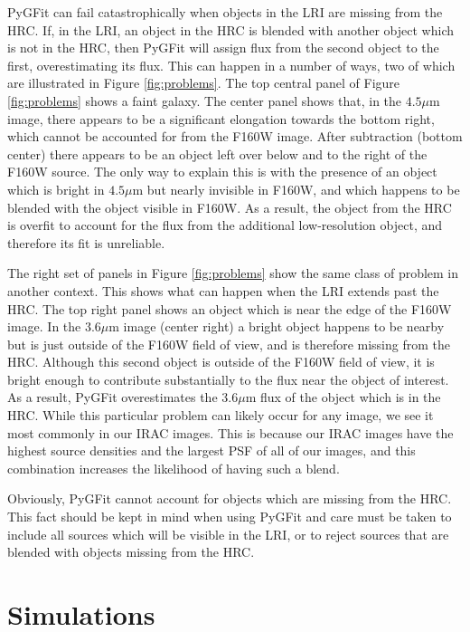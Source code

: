 \documentclass[apj]{emulateapj}
\newcommand{\pygfit}{PyGFit}
\begin{document}
\pygfit{} can fail catastrophically when objects in the LRI are missing from the HRC.  If, in the LRI, an object in the HRC is blended with another object which is not in the HRC, then \pygfit{} will assign flux from the second object to the first, overestimating its flux.  This can happen in a number of ways, two of which are illustrated in Figure \ref{fig:problems}.  The top central panel of Figure \ref{fig:problems} shows a faint galaxy.  The center panel shows that, in the $4.5\mu$m image, there appears to be a significant elongation towards the bottom right, which cannot be accounted for from the F160W image.  After subtraction (bottom center) there appears to be an object left over below and to the right of the F160W source.  The only way to explain this is with the presence of an object which is bright in $4.5\mu$m but nearly invisible in F160W, and which happens to be blended with the object visible in F160W.  As a result, the object from the HRC is overfit to account for the flux from the additional low-resolution object, and therefore its fit is unreliable.

The right set of panels in Figure \ref{fig:problems} show the same class of problem in another context.  This shows what can happen when the LRI extends past the HRC.  The top right panel shows an object which is near the edge of the F160W image.  In the $3.6\mu$m image (center right) a bright object happens to be nearby but is just outside of the F160W field of view, and is therefore missing from the HRC.  Although this second object is outside of the F160W field of view, it is bright enough to contribute substantially to the flux near the object of interest.  As a result, \pygfit{} overestimates the $3.6\mu$m flux of the object which is in the HRC.  While this particular problem can likely occur for any image, we see it most commonly in our IRAC images.  This is because our IRAC images have the highest source densities and the largest PSF of all of our images, and this combination increases the likelihood of having such a blend.

Obviously, \pygfit{} cannot account for objects which are missing from the HRC.  This fact should be kept in mind when using \pygfit{} and care must be taken to include all sources which will be visible in the LRI, or to reject sources that are blended with objects missing from the HRC.

\section{Simulations}\label{sec:sims}
\end{document}
